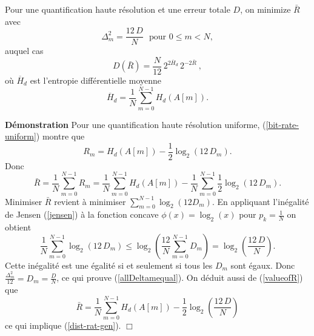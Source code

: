 \begin{theorem}
\label{bit-alloc-th} 
Pour une quantification haute r\'esolution et une erreur 
totale $D$, on minimize $\bar R$ avec
\begin{equation}
\label{allDeltamequal}
\Delta_m^2 = \frac {12\, D} N~~~\mbox{pour $0 \leq m < N$},
\end{equation}
auquel cas
\begin{equation}
\label{dist-rat-gen}
D(\bar R) = \frac N {12} \, 2^{2 \overline H_d} \, 2^{-2 \bar R} ~,
\end{equation}
o\`u $\overline H_d$ est l'entropie diff\'erentielle moyenne
\[
\overline H_d = \frac 1 N \sum_{m=0}^{N-1} H_d (A[m]) .
\]
\end{theorem}

{\bf D\'emonstration} Pour une quantification haute r\'esolution
uniforme, (\ref{bit-rate-uniform}) montre que
\[
R_m = H_d (A[m]) -  \frac 1 2 \log_2 (12 \, D_m ).
\]
Donc
\begin{equation}
\label{valueofR}
\bar R = \frac 1 N \sum_{m=0}^{N-1} R_m = 
\frac 1 N \sum_{m=0}^{N-1}  H_d (A[m]) -  
\frac 1 N \sum_{m=0}^{N-1}  \frac 1 2 \log_2 (12 \, D_m ).
\end{equation}
Minimiser $\bar R$ revient \`a minimiser
$\sum_{m=0}^{N-1}  \log_2 (12 D_m )$.
En appliquant l'in\'egalit\'e de Jensen (\ref{jensen}) \`a
la fonction concave $\phi(x) = \log_2 (x)$ pour $p_k = \frac 1 N$
on obtient
\[
\frac 1 N \sum_{m=0}^{N-1} \log_2 (12 \, D_m ) \leq 
\log_2 \left(\frac {12} N \sum_{m=0}^{N-1} D_m \right) = 
\log_2 \left(\frac {12 \, D} N \right)  .
\]
Cette in\'egalit\'e est une \'egalit\'e si et seulement si tous
les $D_m$ sont \'egaux.
Donc $\frac {\Delta_m^2} {12} = D_m = \frac D N$, ce qui
prouve (\ref{allDeltamequal}). On d\'eduit aussi de
(\ref{valueofR}) que
\[
\bar R = \frac 1 N \sum_{m=0}^{N-1}  H_d (A[m]) -  
\frac 1 2 \log_2 \left(\frac {12\, D} N \right)
\]
ce qui implique (\ref{dist-rat-gen}). $\Box$

